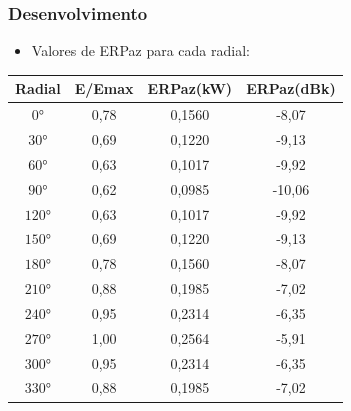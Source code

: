\documentclass{beamer}
\begin{document}
    
      \begin{frame}
    
      \frametitle{Desenvolvimento}
      
      \begin{itemize}
      
      \item Valores de ERPaz para cada radial:
      
       \end{itemize}
	 
      \begin{center}
      
     \def\tablename{Tabela}
	  \begin{table}
	  \vspace*{0.05cm}
	  \centering

	      \begin{tabular}{|c|c|c|c|} \hline

	      Radial & E/Emax & ERPaz(kW) & ERPaz(dBk)\\\hline\hline
	      $0°$  & 0,78 & 0,1560 & -8,07 \\\hline
	      $30°$ & 0,69 & 0,1220 & -9,13 \\\hline
	      $60°$ & 0,63 & 0,1017 & -9,92 \\\hline
	      $90°$ & 0,62 & 0,0985 & -10,06 \\\hline
	      $120°$& 0,63 & 0,1017 & -9,92 \\\hline
	      $150°$& 0,69 & 0,1220 & -9,13 \\\hline
	      $180°$& 0,78 & 0,1560 & -8,07 \\\hline
	      $210°$& 0,88 & 0,1985 & -7,02 \\\hline
	      $240°$& 0,95 & 0,2314 & -6,35 \\\hline
	      $270°$& 1,00 & 0,2564 & -5,91 \\\hline
	      $300°$& 0,95 & 0,2314 & -6,35 \\\hline
	      $330°$& 0,88 & 0,1985 & -7,02 \\\hline

	      \end{tabular}
	
	  \label{tabelaERPaz}
	  \end{table}	
           
        \end{center}
      
      
  
  \end{frame}
  
\end{document}
